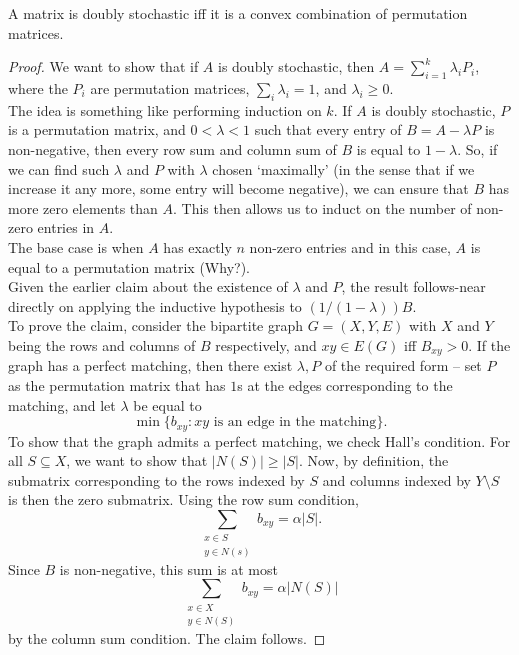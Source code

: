 			\begin{ftheo}
				A matrix is doubly stochastic iff it is a convex combination of permutation matrices.
			\end{ftheo}
			\begin{proof}
				We want to show that if $A$ is doubly stochastic, then $A = \sum_{i=1}^k \lambda_i P_i$, where the $P_i$ are permutation matrices, $\sum_i \lambda_i = 1$, and $\lambda_i \ge 0$.\\
				The idea is something like performing induction on $k$. If $A$ is doubly stochastic, $P$ is a permutation matrix, and $0 < \lambda < 1$ such that every entry of $B = A - \lambda P$ is non-negative, then every row sum and column sum of $B$ is equal to $1-\lambda$.
				So, if we can find such $\lambda$ and $P$ with $\lambda$ chosen `maximally' (in the sense that if we increase it any more, some entry will become negative), we can ensure that $B$ has more zero elements than $A$. This then allows us to induct on the number of non-zero entries in $A$.\\
				The base case is when $A$ has exactly $n$ non-zero entries and in this case, $A$ is equal to a permutation matrix (Why?). \\
				Given the earlier claim about the existence of $\lambda$ and $P$, the result follows-near directly on applying the inductive hypothesis to $(1/(1-\lambda)) B$.\\
				To prove the claim, consider the bipartite graph $G= (X,Y,E)$ with $X$ and $Y$ being the rows and columns of $B$ respectively, and $xy\in E(G)$ iff $B_{xy} > 0$. If the graph has a perfect matching, then there exist $\lambda,P$ of the required form -- set $P$ as the permutation matrix that has $1$s at the edges corresponding to the matching, and let $\lambda$ be equal to
				\[ \min\{ b_{xy} : xy \text{ is an edge in the matching} \}. \]
				To show that the graph admits a perfect matching, we check Hall's condition. For all $S\subseteq X$, we want to show that $|N(S)| \ge |S|$. Now, by definition, the submatrix corresponding to the rows indexed by $S$ and columns indexed by $Y\setminus S$ is then the zero submatrix. Using the row sum condition,
				\[ \sum_{\substack{x\in S \\ y \in N(s )}} b_{xy} = \alpha |S|. \]
				Since $B$ is non-negative, this sum is at most
				\[ \sum_{\substack{x\in X \\ y\in N(S)}} b_{xy} = \alpha |N(S)| \]
				by the column sum condition. The claim follows.
			\end{proof}

